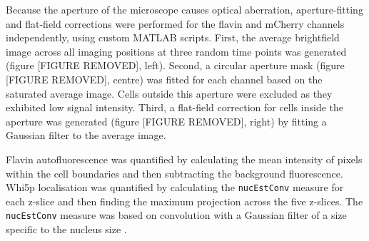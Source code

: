 Because the aperture of the microscope causes optical aberration, aperture-fitting and flat-field corrections were performed for the flavin and mCherry channels independently, using custom MATLAB scripts.
First, the average brightfield image across all imaging positions at three random time points was generated (figure [FIGURE REMOVED], left).
Second, a circular aperture mask (figure [FIGURE REMOVED], centre) was fitted for each channel based on the saturated average image.
Cells outside this aperture were excluded as they exhibited low signal intensity.
Third, a flat-field correction for cells inside the aperture was generated (figure [FIGURE REMOVED], right) by fitting a Gaussian filter to the average image.

Flavin autofluorescence was quantified by calculating the mean intensity of pixels within the cell boundaries and then subtracting the background fluorescence. %
Whi5p localisation was quantified by calculating the \texttt{nucEstConv} measure for each z-slice and then finding the maximum projection across the five z-slices.
The \texttt{nucEstConv} measure was based on convolution with a Gaussian filter of a size specific to the nucleus size \parencite{geronHandsOnMachineLearning2017}.

